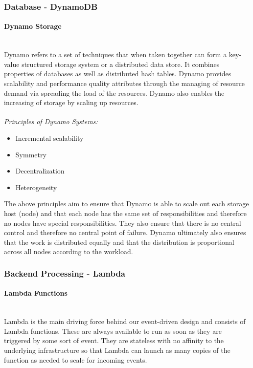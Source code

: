 \documentclass{article}
\begin{document}
	\subsubsection{Database - DynamoDB}
		\paragraph{Dynamo Storage}\mbox{}\\
		Dynamo refers to a set of techniques that when taken together can form a key-value structured storage system or a distributed data store. It combines properties of databases as well as distributed hash tables. Dynamo provides scalability and performance quality attributes through the managing of resource demand via spreading the load of the resources. Dynamo also enables the increasing of storage by scaling up resources.\\\\
		\textit{Principles of Dynamo Systems:}
		\begin{itemize}
			\item Incremental scalability
			\item Symmetry
			\item Decentralization
			\item Heterogeneity
		\end{itemize}
		The above principles aim to ensure that Dynamo is able to scale out each storage host (node) and that each node has the same set of responsibilities and therefore no nodes have special responsibilities. They also ensure that there is no central control and therefore no central point of failure. Dynamo ultimately also ensures that the work is distributed equally and that the distribution is proportional across all nodes according to the workload.
	\subsubsection{Backend Processing - Lambda}
		\paragraph{Lambda Functions}\mbox{}\\
		Lambda is the main driving force behind our event-driven design and consists of Lambda functions. These are always available to run as soon as they are triggered by some sort of event. They are stateless with no affinity to the underlying infrastructure so that Lambda can launch as many copies of the function as needed to scale for incoming events.
		
\end{document}
